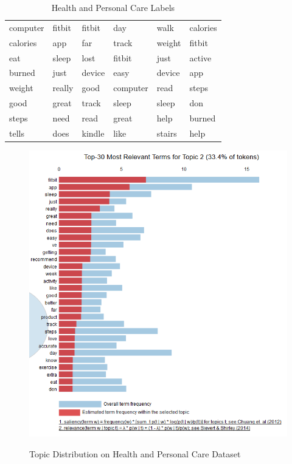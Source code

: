 \begin{table}[h]
\centering
\begin{tabular}{ llllll }
\midrule
computer & fitbit & fitbit & day & walk & calories \\
calories & app & far & track & weight & fitbit \\
eat & sleep & lost & fitbit & just & active \\
burned & just & device & easy & device & app \\
weight & really & good & computer & read & steps \\
good & great & track & sleep & sleep & don \\
steps & need & read & great & help & burned \\
tells & does & kindle & like & stairs & help \\
\bottomrule          
\end{tabular}
\caption{Health and Personal Care Labels}
\label{Health and Personal Care Labels}
\end{table}

\begin{figure}[H]
  {\includegraphics[width = 0.85 \textwidth]{img/lda/2a.PNG}}
  \caption{Topic Distribution on Health and Personal Care Dataset}
\end{figure}

